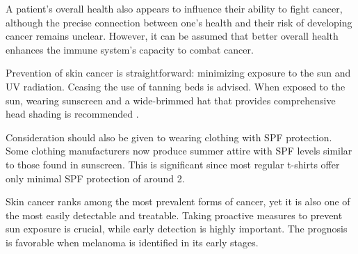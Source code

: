 A patient's overall health also appears to influence their ability to fight
cancer, although the precise connection between one's health and their risk of
developing cancer remains unclear. However, it can be assumed that better
overall health enhances the immune system's capacity to combat cancer. \newline

Prevention of skin cancer is straightforward: minimizing exposure to the sun
and UV radiation. Ceasing the use of tanning beds is advised. When exposed to
the sun, wearing sunscreen and a wide-brimmed hat that provides comprehensive
head shading is recommended \cite{OrigenAndTreatment}. \newline

Consideration should also be given to wearing clothing with SPF protection.
Some clothing manufacturers now produce summer attire with SPF levels similar
to those found in sunscreen. This is significant since most regular t-shirts
offer only minimal SPF protection of around 2. \newline

Skin cancer ranks among the most prevalent forms of cancer, yet it is also one
of the most easily detectable and treatable. Taking proactive measures to
prevent sun exposure is crucial, while early detection is highly important. The
prognosis is favorable when melanoma is identified in its early stages.
